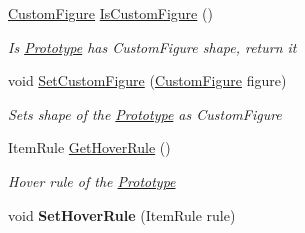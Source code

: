 \begin{DoxyCompactItemize}
\mbox{\hyperlink{class_space_v_i_l_1_1_decorations_1_1_custom_figure}{Custom\+Figure}} \mbox{\hyperlink{class_space_v_i_l_1_1_prototype_ad370acd0c610b7a7dc6d402b0cccf09a}{Is\+Custom\+Figure}} ()
\begin{DoxyCompactList}\small\item\em Is \mbox{\hyperlink{class_space_v_i_l_1_1_prototype}{Prototype}} has Custom\+Figure shape, return it ~\newline
\end{DoxyCompactList}\item 
void \mbox{\hyperlink{class_space_v_i_l_1_1_prototype_a7c6bb62d8c795366532c7295b2b71d30}{Set\+Custom\+Figure}} (\mbox{\hyperlink{class_space_v_i_l_1_1_decorations_1_1_custom_figure}{Custom\+Figure}} figure)
\begin{DoxyCompactList}\small\item\em Sets shape of the \mbox{\hyperlink{class_space_v_i_l_1_1_prototype}{Prototype}} as Custom\+Figure \end{DoxyCompactList}\item 
Item\+Rule \mbox{\hyperlink{class_space_v_i_l_1_1_prototype_af90d17511ea27379d9510606938a0443}{Get\+Hover\+Rule}} ()
\begin{DoxyCompactList}\small\item\em Hover rule of the \mbox{\hyperlink{class_space_v_i_l_1_1_prototype}{Prototype}} \end{DoxyCompactList}\item 
\mbox{\label{class_space_v_i_l_1_1_prototype_a439ef362241c2da17cf0c5a4c49d4888}} 
void {\bfseries Set\+Hover\+Rule} (Item\+Rule rule)
\end{DoxyCompactItemize}
